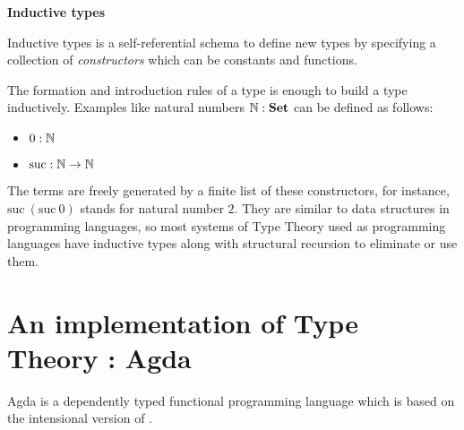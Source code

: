 \textbf{Inductive types}\label{df:inductivetypes}

Inductive types is a self-referential schema to define new types by specifying a collection of \emph{constructors} which can be constants and functions.

The formation and introduction rules of a type is enough to build a type inductively. Examples like
natural numbers $\mathbb{N} : \operatorname{\mathbf{Set}}$ can be defined as follows:

\begin{itemize}
\item $0 : \mathbb{N}$
\item $\text{suc} : \mathbb{N} \rightarrow \mathbb{N}$
\end{itemize}

The terms are freely generated by a finite list of these constructors, for instance, $\text{suc} ~(\text{suc} ~0)$ stands for natural number $2$. They are similar to data structures in programming languages, so most systems of Type Theory used as programming languages have inductive types along with structural recursion to eliminate or use them.


\section{An implementation of Type Theory : Agda}

Agda is a dependently typed functional programming language which is based on the intensional version
of \mltt \cite{agdawiki:main}. 

